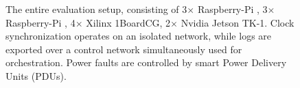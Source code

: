\begin{figure}
    \caption{The entire evaluation setup, consisting of 3$\times$ Raspberry-Pi {}, 3$\times$ Raspberry-Pi {}, 4$\times$ {\sffamily X}ilinx 1BoardCG, 2$\times$ {\sffamily N}vidia Jetson TK-1. Clock synchronization operates on an isolated network, while logs are exported over a control network simultaneously used for orchestration. Power faults are controlled by smart Power Delivery Units (PDUs).}
    \label{fig:testbed}
\end{figure}
